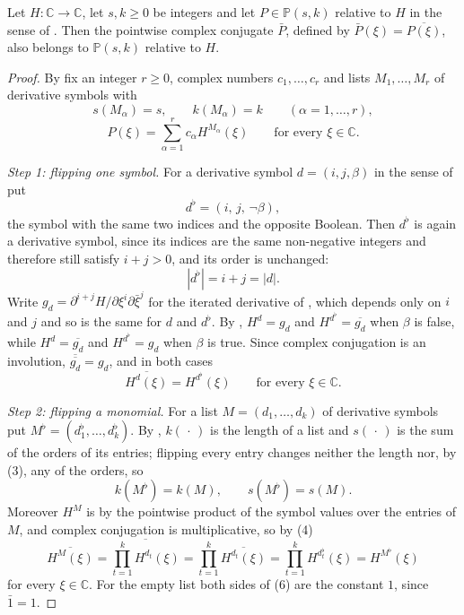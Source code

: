 \begin{lemma}
Let $H\colon\mathbb{C}\to\mathbb{C}$, let $s,k\ge0$ be integers and let
$P\in\mathbb{P}(s,k)$ relative to $H$ in the sense of .  Then
the pointwise complex conjugate $\bar P$, defined by
$\bar P(\xi)=\overline{P(\xi)}$, also belongs to $\mathbb{P}(s,k)$ relative to
$H$.
\end{lemma}
\begin{proof}
By  fix an integer $r\ge0$, complex numbers $c_1,\dots,c_r$ and
lists $M_1,\dots,M_r$ of derivative symbols with
\begin{equation}\tag{1}
  s(M_\alpha)=s,\qquad k(M_\alpha)=k\qquad(\alpha=1,\dots,r),
\end{equation}
\begin{equation}\tag{2}
  P(\xi)=\sum_{\alpha=1}^{r}c_\alpha H^{M_\alpha}(\xi)\qquad\text{for every }\xi\in\mathbb{C}.
\end{equation}

\emph{Step 1: flipping one symbol.}  For a derivative symbol $d=(i,j,\beta)$ in
the sense of  put
\[
  d^{\flat}=(i,\,j,\,\neg\beta),
\]
the symbol with the same two indices and the opposite Boolean.  Then
$d^{\flat}$ is again a derivative symbol, since its indices are the same
non-negative integers and therefore still satisfy $i+j>0$, and its order is
unchanged:
\begin{equation}\tag{3}
  |d^{\flat}|=i+j=|d| .
\end{equation}
Write $g_d=\partial^{i+j}H/\partial\xi^i\partial\bar\xi^j$ for the iterated
derivative of , which depends only on $i$ and $j$ and so
is the same for $d$ and $d^{\flat}$.  By ,
$H^{d}=g_d$ and $H^{d^{\flat}}=\overline{g_d}$ when $\beta$ is false, while
$H^{d}=\overline{g_d}$ and $H^{d^{\flat}}=g_d$ when $\beta$ is true.  Since
complex conjugation is an involution, $\overline{\overline{g_d}}=g_d$, and in
both cases
\begin{equation}\tag{4}
  \overline{H^{d}(\xi)}=H^{d^{\flat}}(\xi)\qquad\text{for every }\xi\in\mathbb{C}.
\end{equation}

\emph{Step 2: flipping a monomial.}  For a list $M=(d_1,\dots,d_k)$ of
derivative symbols put $M^{\flat}=(d_1^{\flat},\dots,d_k^{\flat})$.  By
, $k(\,\cdot\,)$ is the length of a list and
$s(\,\cdot\,)$ is the sum of the orders of its entries; flipping every entry
changes neither the length nor, by (3), any of the orders, so
\begin{equation}\tag{5}
  k(M^{\flat})=k(M),\qquad s(M^{\flat})=s(M).
\end{equation}
Moreover $H^{M}$ is by  the pointwise product of the
symbol values over the entries of $M$, and complex conjugation is
multiplicative, so by (4)
\begin{equation}\tag{6}
  \overline{H^{M}(\xi)}
  =\overline{\prod_{t=1}^{k}H^{d_t}(\xi)}
  =\prod_{t=1}^{k}\overline{H^{d_t}(\xi)}
  =\prod_{t=1}^{k}H^{d_t^{\flat}}(\xi)
  =H^{M^{\flat}}(\xi)
\end{equation}
for every $\xi\in\mathbb{C}$.  For the empty list both sides of (6) are the
constant $1$, since $\bar1=1$.


\end{proof}
